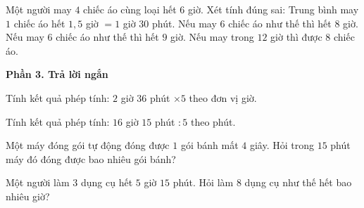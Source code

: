 \begin{ex} %
Một người may $4$ chiếc áo cùng loại hết $6$ giờ. Xét tính đúng sai:
\choiceTF
{\True Trung bình may $1$ chiếc áo hết $1{,}5$ giờ $= 1$ giờ $30$ phút.}
{Nếu may $6$ chiếc áo như thế thì hết $8$ giờ.}
{\True Nếu may $6$ chiếc áo như thế thì hết $9$ giờ.}
{\True Nếu may trong $12$ giờ thì được $8$ chiếc áo.}
\end{ex}

\textbf{Phần 3. Trả lời ngắn}

\begin{ex} %
Tính kết quả phép tính: $2$ giờ $36$ phút $\times 5$ theo đơn vị giờ.
\end{ex}

\begin{ex} %
Tính kết quả phép tính: $16$ giờ $15$ phút $: 5$ theo phút.
\end{ex}

\begin{ex} %
Một máy đóng gói tự động đóng được $1$ gói bánh mất $4$ giây. Hỏi trong $15$ phút máy đó đóng được bao nhiêu gói bánh?
\end{ex}

\begin{ex} %
Một người làm $3$ dụng cụ hết $5$ giờ $15$ phút. Hỏi làm $8$ dụng cụ như thế hết bao nhiêu giờ?
\end{ex}

